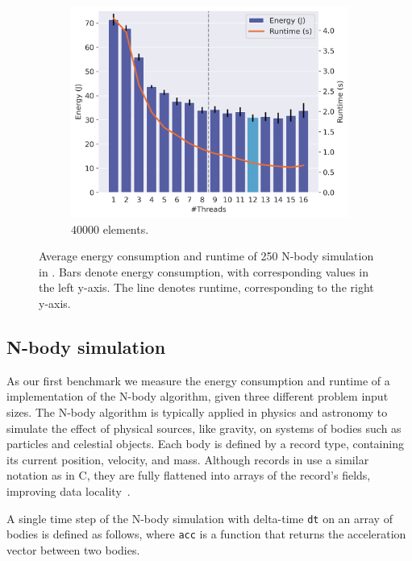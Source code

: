 \begin{figure}[!ht]
\begin{subfigure}{0.33\linewidth}
        \includegraphics[width=\linewidth]{images/nbody_40000.png}
        \caption{$40000$ elements.}
        \label{fig:nbody3}
    \end{subfigure}%
    \caption{Average energy consumption and runtime of 250 N-body simulation in \sac{}.
    Bars denote energy consumption, with corresponding values in the left y-axis.
    The line denotes runtime, corresponding to the right y-axis.}
    \label{fig:nbody}
\end{figure}

\subsection{N-body simulation}

As our first benchmark we measure the energy consumption and runtime of a \sac{} implementation of the N-body algorithm, given three different problem input sizes.
The N-body algorithm is typically applied in physics and astronomy to simulate the effect of physical sources, like gravity, on systems of bodies such as particles and celestial objects.
Each body is defined by a record type, containing its current position, velocity, and mass.
Although records in \sac{} use a similar notation as in C, they are fully flattened into arrays of the record's fields, improving data locality~\cite{sac-records}.

A single time step of the N-body simulation with delta-time \verb|dt| on an array of bodies is defined as follows, where \verb|acc| is a function that returns the acceleration vector between two bodies.

